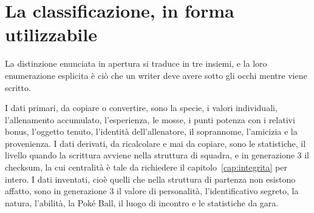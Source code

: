 \section{La classificazione, in forma utilizzabile}

La distinzione enunciata in apertura si traduce in tre insiemi, e la loro enumerazione esplicita è ciò che un writer deve avere sotto gli occhi mentre viene scritto.

I dati primari, da copiare o convertire, sono la specie, i valori individuali, l'allenamento accumulato, l'esperienza, le mosse, i punti potenza con i relativi bonus, l'oggetto tenuto, l'identità dell'allenatore, il soprannome, l'amicizia e la provenienza. I dati derivati, da ricalcolare e mai da copiare, sono le statistiche, il livello quando la scrittura avviene nella struttura di squadra, e in generazione 3 il checksum, la cui centralità è tale da richiedere il capitolo~\ref{cap:integrita} per intero. I dati inventati, cioè quelli che nella struttura di partenza non esistono affatto, sono in generazione 3 il valore di personalità, l'identificativo segreto, la natura, l'abilità, la Poké Ball, il luogo di incontro e le statistiche da gara.
